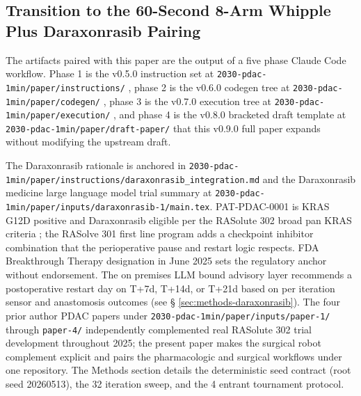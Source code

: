 \subsection{Transition to the 60-Second 8-Arm Whipple Plus Daraxonrasib Pairing}
\label{sec:intro-transition}

The artifacts paired with this paper are the output of a five
phase Claude Code workflow. Phase 1 is the v0.5.0 instruction set
at \texttt{2030-pdac-1min/paper/instructions/}
\cite{pdac-instructions-v050}, phase 2 is the v0.6.0 codegen tree
at \texttt{2030-pdac-1min/paper/codegen/}
\cite{pdac-codegen-v060}, phase 3 is the v0.7.0 execution tree at
\texttt{2030-pdac-1min/paper/execution/}
\cite{pdac-execution-v070}, and phase 4 is the v0.8.0 bracketed
draft template at \texttt{2030-pdac-1min/paper/draft-paper/}
\cite{pdac-draft-paper-v080} that this v0.9.0 full paper expands
without modifying the upstream draft.

The Daraxonrasib rationale is anchored in
\texttt{2030-pdac-1min/paper/instructions/daraxonrasib_integration.md} 
and the Daraxonrasib medicine large language model trial summary
\cite{kawchak_2025_18099351} at
\texttt{2030-pdac-1min/paper/inputs/daraxonrasib-1/main.tex}.
PAT-PDAC-0001 is KRAS G12D positive and Daraxonrasib eligible per
the RASolute 302 broad pan KRAS criteria \cite{rasolute302}; the
RASolve 301 first line program \cite{rasolve301} adds a checkpoint
inhibitor combination that the perioperative pause and restart
logic respects. FDA Breakthrough Therapy designation in June 2025
\cite{rev-fda-breakthrough} sets the regulatory anchor without
endorsement. The on premises LLM bound advisory layer recommends a
postoperative restart day on T+7d, T+14d, or T+21d based on per
iteration sensor and anastomosis outcomes (see \S
\ref{sec:methods-daraxonrasib}). The four prior author PDAC papers
under \texttt{2030-pdac-1min/paper/inputs/paper-1/} through
\texttt{paper-4/} \cite{kawchak_2025_15735068,
kawchak_2025_16415815, kawchak_2025_17001137,
kawchak_2025_17239510} independently complemented real RASolute
302 trial development throughout 2025; the present paper makes the
surgical robot complement explicit and pairs the pharmacologic and
surgical workflows under one repository. The Methods section
details the deterministic seed contract (root seed 20260513), the
32 iteration sweep, and the 4 entrant tournament protocol.

\clearpage
